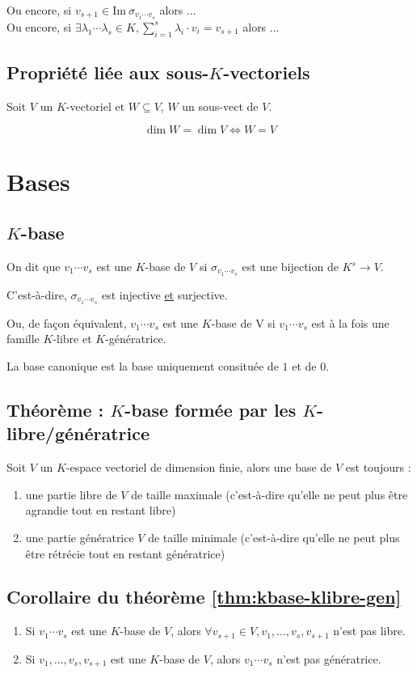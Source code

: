 \documentclass[a4paper,10pt]{article}
\newcommand{\ap}{ \rightarrow} %
\newcommand{\im}{\mathrm{Im}\:} %
\newcommand{\ioi}{\Leftrightarrow} %
\begin{document}
   Ou encore, si $v_{s+1} \in \im \sigma_{v_1 \cdots v_s}$ alors ...\\
   Ou encore, si $\exists \lambda_1 \cdots \lambda_s \in K, \sum^{s}_{i=1} \lambda_i \cdot v_i = v_{s+1}$ alors ...

  \subsection{Propriété liée aux sous-$K$-vectoriels}
   Soit $V$ un $K$-vectoriel et $W \subseteq V$, $W$ un sous-vect de $V$.

   $$\dim W = \dim V \ioi W=V$$

 \section{Bases}
  \subsection{$K$-base}
   On dit que $v_1 \cdots v_s$ est une $K$-base de $V$ si $\sigma_{v_1 \cdots v_s}$ est une bijection de $K^s \ap V$.

   C'est-à-dire, $\sigma_{v_1 \cdots v_s}$ est injective \underline{et} surjective.

   Ou, de façon équivalent, $v_1 \cdots v_s$ est une $K$-base de V si $v_1 \cdots v_s$ est à la fois une famille $K$-libre et $K$-génératrice.

   La base canonique est la base uniquement consituée de $1$ et de $0$.

  \subsection{Théorème : $K$-base formée par les $K$-libre/génératrice\label{thm:kbase-klibre-gen}}
   Soit $V$ un $K$-espace vectoriel de dimension finie, alors une base de $V$ est toujours :
    \begin{enumerate}
     \item une partie libre de $V$ de taille maximale (c'est-à-dire qu'elle ne peut plus être agrandie tout en restant libre)
     \item une partie génératrice $V$ de taille minimale (c'est-à-dire qu'elle ne peut plus être rétrécie tout en restant génératrice)
    \end{enumerate}

  \subsection{Corollaire du théorème \ref{thm:kbase-klibre-gen}}
   \begin{enumerate}
    \item Si $v_1 \cdots v_s$ est une $K$-base de $V$, alors $\forall v_{s+1} \in V, v_1, \hdots, v_s, v_{s+1}$ n'est pas libre.
    \item Si $v_1, \hdots, v_s, v_{s+1}$ est une $K$-base de $V$, alors $v_1 \cdots v_s$ n'est pas génératrice.
   \end{enumerate}
\end{document}

